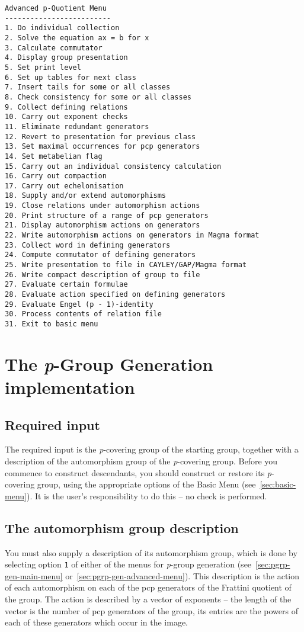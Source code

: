\documentclass[12pt]{article}
\begin{document}
\begin{verbatim}
Advanced p-Quotient Menu
-------------------------
1. Do individual collection
2. Solve the equation ax = b for x
3. Calculate commutator
4. Display group presentation
5. Set print level
6. Set up tables for next class
7. Insert tails for some or all classes
8. Check consistency for some or all classes
9. Collect defining relations
10. Carry out exponent checks
11. Eliminate redundant generators
12. Revert to presentation for previous class
13. Set maximal occurrences for pcp generators
14. Set metabelian flag
15. Carry out an individual consistency calculation
16. Carry out compaction
17. Carry out echelonisation
18. Supply and/or extend automorphisms
19. Close relations under automorphism actions
20. Print structure of a range of pcp generators
21. Display automorphism actions on generators
22. Write automorphism actions on generators in Magma format
23. Collect word in defining generators
24. Compute commutator of defining generators
25. Write presentation to file in CAYLEY/GAP/Magma format
26. Write compact description of group to file
27. Evaluate certain formulae
28. Evaluate action specified on defining generators
29. Evaluate Engel (p - 1)-identity
30. Process contents of relation file
31. Exit to basic menu
\end{verbatim}

\section{The {\it p}-Group Generation implementation}
\subsection{Required input}
The required input is the {\it p}-covering group of the starting group,
together with a description of the automorphism group of the {\it p}-covering
group.
Before you commence to construct descendants,  
you should construct or restore its {\it p}-covering group,
using the appropriate options of the Basic Menu (see~\ref{sec:basic-menu}).
It is the user's responsibility to do this -- no check is performed.

\subsection{The automorphism group description}\label{sec:autgp-desc}
You must also supply a description of its automorphism group,
which is done by selecting option \texttt{1} of either 
of the menus for {\it p}-group generation
(see~\ref{sec:pgrp-gen-main-menu} or~\ref{sec:pgrp-gen-advanced-menu}).
This description is the action of each automorphism on each of the 
pcp generators of the Frattini quotient of the group.
The action is described by a vector of exponents -- the length
of the vector is the number of pcp generators of the group,
its entries are the powers of each of these generators 
which occur in the image.
\end{document}

